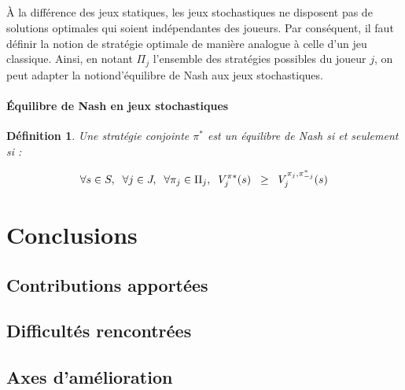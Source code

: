 \documentclass[a4paper, 12pt, twoside]{article}
\newtheorem{definition}{Définition}
\begin{document}
{{\subparagraph*{}{À la différence des jeux statiques, les jeux stochastiques ne disposent pas de solutions optimales qui soient indépendantes des joueurs. Par conséquent, il faut définir la notion de stratégie optimale de manière analogue à
celle d’un jeu classique. Ainsi, en notant $\Pi_{j}$ l’ensemble des stratégies possibles du joueur $j$, on peut adapter la notion\textsf{d’équilibre de Nash} aux jeux stochastiques.

\paragraph{Équilibre de Nash en jeux stochastiques}
\begin{definition}
Une stratégie conjointe $\pi^{*}$ est un équilibre de Nash si et seulement si : 
\end{definition}
\begin{align*}
\forall s \in S,\hspace{0,2 cm} \forall j \in J, \hspace{0,2 cm} \forall \pi_{j} \in \Pi_{j}, \hspace{0,2 cm} V_{j}^{\pi*}(s) \hspace{0,2 cm}\geq \hspace{0,2 cm} V_{j}^{\pi_{j},\pi_{-j}^{*}}(s)
\end{align*}
\newpage
\section{Conclusions}
\subsection{Contributions apportées}
\subsection{Difficultés rencontrées}
\subsection{Axes d'amélioration}

\newpage
}}}
\end{document}
